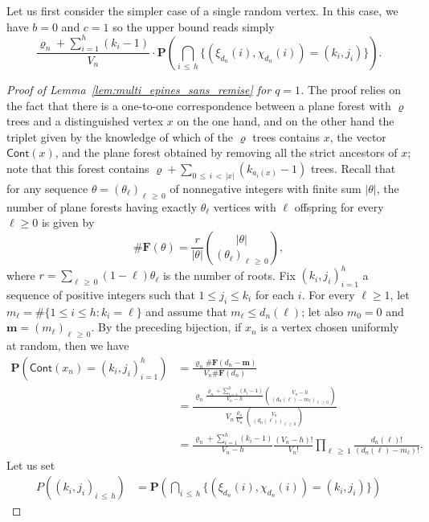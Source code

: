 \documentclass[AHL,Unicode,longabstracts,published]{cedram}
\newcommand{\ensembles}[1]{\mathbf{#1}}
\renewcommand{\P}{\ensembles{P}}
\renewcommand{\Pr}[1]{\P\left(#1\right)}
\newcommand{\1}{\ensembles{1}}
\newcommand{\m}{\mathbf{m}}
\renewcommand{\le}{\leqslant}
\renewcommand{\ge}{\geqslant}
\newcommand{\Cont}{\mathsf{Cont}}
\newcommand{\vertices}{V}
\begin{document}
Let us first consider the simpler case of a single random vertex. In this case, we have $b=0$ and $c=1$ so the upper bound reads simply
\[
\frac{\varrho_n + \sum\limits_{i=1}^h (k_i - 1)}{\vertices_n}
\cdot \Pr{\bigcap_{i\,\le\,h} \big\{\left(\xi_{d_n}(i), \chi_{d_n}(i)\right) = \left(k_i, j_i\right)\big\}}.
\]


\begin{proof}[Proof of Lemma~\ref{lem:multi_epines_sans_remise} for $q = 1$]
The proof relies on the fact that there is a one-to-one correspondence between a plane forest with $\varrho$ trees and a distinguished vertex $x$ on the one hand, and on the other hand the triplet given by the knowledge of which of the $\varrho$ trees contains $x$, the vector $\Cont(x)$, and the plane forest obtained by removing all the strict ancestors of $x$; note that this forest contains $\varrho + \sum_{0\,\le\,i\,<\,|x|} (k_{a_i(x)} - 1)$ trees. Recall that for any sequence $\theta = (\theta_\ell)_{\ell\,\ge\,0}$ of nonnegative integers with finite sum $|\theta|$, the number of plane forests having exactly $\theta_\ell$ vertices with $\ell$ offspring for every $\ell \ge 0$ is given by
\[
\# \ensembles{F}(\theta) = \frac{r}{|\theta|} \binom{|\theta|}{(\theta_\ell)_{\ell\,\ge\,0}},
\]
where $r= \sum_{\ell\,\ge\,0} (1-\ell) \theta_\ell$ is the number of roots. Fix $(k_i, j_i)_{i=1}^h$ a sequence of positive integers such that $1 \le j_i \le k_i$ for each $i$. For every $\ell \ge 1$, let $m_\ell = \#\{1 \le i \le h : k_i = \ell\}$ and assume that $m_\ell \le d_n(\ell)$; let also $m_0 = 0$ and $\m = (m_\ell)_{\ell\,\ge\,0}$. By the preceding bijection, if $x_n$ is a vertex chosen uniformly at random, then we have
\begin{align*}
\Pr{\Cont(x_n) = \left(k_i, j_i\right)_{i=1}^h} &= \frac{\varrho_n \#\ensembles{F}(d_n - \m)}{\vertices_n \#\ensembles{F}(d_n)}
\\
&= \frac{\varrho_n \frac{\varrho_n + \sum\limits_{i=1}^h (k_i - 1)}{\vertices_n-h} \binom{\vertices_n-h}{\left(d_n(\ell)-m_\ell\right)_{\ell\,\ge\,0}}}{\vertices_n \frac{\varrho_n}{\vertices_n} \binom{\vertices_n}{\left(d_n(\ell)\right)_{\ell\,\ge\, 0}}}
\\
&= \frac{\varrho_n + \sum\limits_{i=1}^h \left(k_i - 1\right)}{\vertices_n-h} \frac{\left(\vertices_n-h\right)!}{\vertices_n!} \prod_{\ell\,\ge\,1} \frac{d_n(\ell)!}{(d_n(\ell)-m_\ell)!}.
\end{align*}
Let us set
\begin{align*}
P\left(\left(k_i, j_i\right)_{i\,\le\,h}\right) &= \Pr{\bigcap_{i\,\le\,h} \big\{\left(\xi_{d_n}(i), \chi_{d_n}(i)\right) = \left(k_i, j_i\right)\big\}}

\end{align*}
\end{proof}
\end{document}
